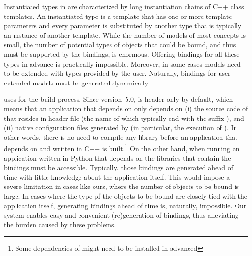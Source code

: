 Instantiated types in \cgal{} are characterized by long instantiation
chains of C++ class templates. An instantiated type is a template that
has one or more template parameters and every parameter is substituted
by another type that is typically an instance of another template.
%
While the number of models of most concepts is small, the number of
potential types of objects that could be bound, and thus must be
supported by the bindings, is enormous. Offering bindings for all
these types in advance is practically impossible. Moreover, in some
cases models need to be extended with types provided by the
user. Naturally, bindings for user-extended models must be generated
dynamically.

\cgal{} uses \cmake{} for the build process.  Since version~5.0,
\cgal{} is header-only by default, which means that an application
that depends on \cgal{} only depends on (i) the source code of \cgal{}
that resides in header file (the name of which typically end with the
suffix ), and (ii) native configuration files
generated by \cmake{} (in particular, the execution of
). In other words, there is no need to compile any
library before an application that depends on \cgal{} and written in
C++ is built.\footnote{Some dependencies of \cgal{} might need to be
  installed in advanced} On the other hand, when running an
application written in Python that depends on \cgal{} the libraries
that contain the bindings must be accessible. Typically, those
bindings are generated ahead of time with little knowledge about the
application itself. This would impose a severe limitation in cases
like ours, where the number of objects to be bound is large. In cases
where the type pf the objects to be bound are closely tied with the
application itself, generating bindings ahead of time is, naturally,
impossible. Our system enables easy and convenient (re)generation of
bindings, thus alleviating the burden caused by these problems.

